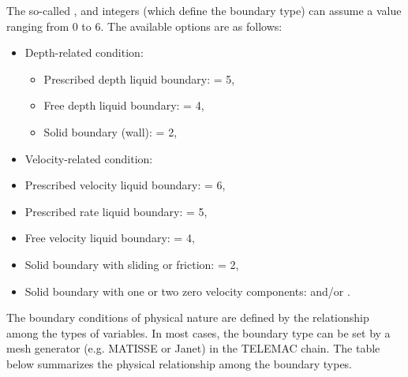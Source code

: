 The so-called ,  and  integers
(which define the boundary type) can assume a value ranging from 0 to 6.
The available options are as follows:

\begin{itemize}
\item Depth-related condition:

\begin{itemize}
\item Prescribed depth liquid boundary:  = 5,

\item Free depth liquid boundary:  = 4,

\item Solid boundary (wall):  = 2,
\end{itemize}

\item Velocity-related condition:

\item Prescribed velocity liquid boundary:  = 6,

\item Prescribed rate liquid boundary:  = 5,

\item Free velocity liquid boundary:  = 4,

\item Solid boundary with sliding or friction:  = 2,

\item Solid boundary with one or two zero velocity components:  and/or
.
\end{itemize}

The boundary conditions of physical nature are defined by the relationship
among the types of variables. In most cases, the boundary type can be set by a
mesh generator (e.g. MATISSE or Janet) in the TELEMAC chain. The table
below summarizes the physical relationship among the boundary types.



